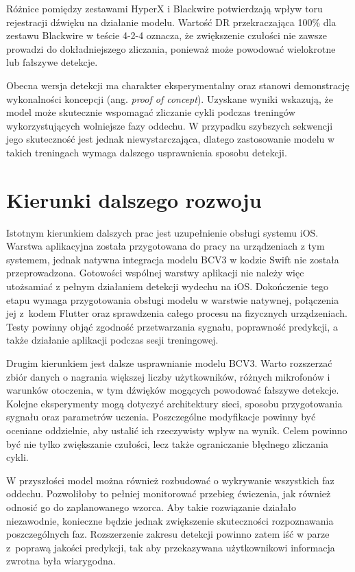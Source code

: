 Różnice pomiędzy zestawami HyperX i Blackwire potwierdzają wpływ toru rejestracji dźwięku na działanie modelu. Wartość DR przekraczająca 100\% dla zestawu Blackwire w teście 4-2-4 oznacza, że zwiększenie czułości nie zawsze prowadzi do dokładniejszego zliczania, ponieważ może powodować wielokrotne lub fałszywe detekcje.

Obecna wersja detekcji ma charakter eksperymentalny oraz stanowi demonstrację wykonalności koncepcji (ang. \textit{proof of concept}). Uzyskane wyniki wskazują, że model może skutecznie wspomagać zliczanie cykli podczas treningów wykorzystujących wolniejsze fazy oddechu. W przypadku szybszych sekwencji jego skuteczność jest jednak niewystarczająca, dlatego zastosowanie modelu w takich treningach wymaga dalszego usprawnienia sposobu detekcji.

\section{Kierunki dalszego rozwoju}

Istotnym kierunkiem dalszych prac jest uzupełnienie obsługi systemu iOS. Warstwa aplikacyjna została przygotowana do pracy na urządzeniach z tym systemem, jednak natywna integracja modelu BCV3 w kodzie Swift nie została przeprowadzona. Gotowości wspólnej warstwy aplikacji nie należy więc utożsamiać z pełnym działaniem detekcji wydechu na iOS. Dokończenie tego etapu wymaga przygotowania obsługi modelu w warstwie natywnej, połączenia jej z~kodem Flutter oraz sprawdzenia całego procesu na fizycznych urządzeniach. Testy powinny objąć zgodność przetwarzania sygnału, poprawność predykcji, a także działanie aplikacji podczas sesji treningowej.

Drugim kierunkiem jest dalsze usprawnianie modelu BCV3. Warto rozszerzać zbiór danych o nagrania większej liczby użytkowników, różnych mikrofonów i warunków otoczenia, w tym dźwięków mogących powodować fałszywe detekcje. Kolejne eksperymenty mogą dotyczyć architektury sieci, sposobu przygotowania sygnału oraz parametrów uczenia. Poszczególne modyfikacje powinny być oceniane oddzielnie, aby ustalić ich rzeczywisty wpływ na wynik. Celem powinno być nie tylko zwiększanie czułości, lecz także ograniczanie błędnego zliczania cykli.

W przyszłości model można również rozbudować o wykrywanie wszystkich faz oddechu. Pozwoliłoby to pełniej monitorować przebieg ćwiczenia, jak również odnosić go do zaplanowanego wzorca. Aby takie rozwiązanie działało niezawodnie, konieczne będzie jednak zwiększenie skuteczności rozpoznawania poszczególnych faz. Rozszerzenie zakresu detekcji powinno zatem iść w parze z~poprawą jakości predykcji, tak aby przekazywana użytkownikowi informacja zwrotna była wiarygodna.

